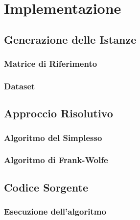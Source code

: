 \chapter{Implementazione}\label{chap:impl}

\section{Generazione delle Istanze}

\subsection{Matrice di Riferimento}

\subsection{Dataset}

\section{Approccio Risolutivo}

\subsection{Algoritmo del Simplesso}

\subsection{Algoritmo di Frank-Wolfe}

\section{Codice Sorgente}

\subsection{Esecuzione dell'algoritmo}
